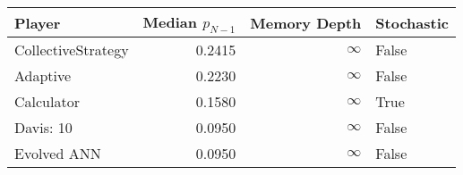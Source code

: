 \begin{tabular}{lrrl}
\toprule
             Player &  Median $p_{N-1}$ &  Memory Depth & Stochastic \\
\midrule
 CollectiveStrategy &            0.2415 &            \(\infty\) &      False \\
           Adaptive &            0.2230 &            \(\infty\) &      False \\
         Calculator &            0.1580 &            \(\infty\) &       True \\
          Davis: 10 &            0.0950 &            \(\infty\) &      False \\
        Evolved ANN &            0.0950 &            \(\infty\) &      False \\
\bottomrule
\end{tabular}
